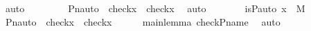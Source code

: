 \begin{isabellebody}
\ auto\ \isanewline
\ \ \ \ \isamarkupfalse%
\ \isamarkupfalse%
\ {\isachardoublequoteopen}Pn{\isacharunderscore}{\kern0pt}auto{\isacharparenleft}{\kern0pt}{\isasympi}{\isacharparenright}{\kern0pt}\ {\isacharbackquote}{\kern0pt}\ check{\isacharparenleft}{\kern0pt}x{\isacharparenright}{\kern0pt}\ {\isacharequal}{\kern0pt}\ check{\isacharparenleft}{\kern0pt}x{\isacharparenright}{\kern0pt}{\isachardoublequoteclose}\ \isamarkupfalse%
\ auto\ \isanewline
\ \ \isamarkupfalse%
\isanewline
\ \ \isamarkupfalse%
\ {\isachardoublequoteopen}is{\isacharunderscore}{\kern0pt}P{\isacharunderscore}{\kern0pt}auto{\isacharparenleft}{\kern0pt}{\isasympi}{\isacharparenright}{\kern0pt}{\isachardoublequoteclose}\ {\isachardoublequoteopen}x\ {\isasymin}\ M{\isachardoublequoteclose}\isanewline
\ \ \isamarkupfalse%
\ \isamarkupfalse%
\ {\isachardoublequoteopen}Pn{\isacharunderscore}{\kern0pt}auto{\isacharparenleft}{\kern0pt}{\isasympi}{\isacharparenright}{\kern0pt}\ {\isacharbackquote}{\kern0pt}\ check{\isacharparenleft}{\kern0pt}x{\isacharparenright}{\kern0pt}\ {\isacharequal}{\kern0pt}\ check{\isacharparenleft}{\kern0pt}x{\isacharparenright}{\kern0pt}{\isachardoublequoteclose}\isanewline
\ \ \ \ \isamarkupfalse%
\ mainlemma\ check{\isacharunderscore}{\kern0pt}P{\isacharunderscore}{\kern0pt}name\ \isamarkupfalse%
\ auto\isanewline
{}\isamarkupfalse%
%
\endisatagproof
{\isafoldproof}%
%
\isadelimproof
\isanewline
%
\endisadelimproof
\isanewline
{}\isamarkupfalse%
\ \isanewline
%
\isadelimtheory
%
\endisadelimtheory
%
\isatagtheory
{}\isamarkupfalse%
%
\endisatagtheory
{\isafoldtheory}%
%
\isadelimtheory
%
\endisadelimtheory
%
\end{isabellebody}%
\endinput
